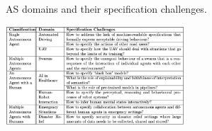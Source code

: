 \documentclass[sigconf,nonacm]{acmart}%
\begin{document}

\begin{table}
	\caption{AS domains and their specification challenges.} \label{AS-challenges}   
	\includegraphics[width=0.5\textwidth]{figures/Domains.png}
\end{table} 

	
\end{document}
